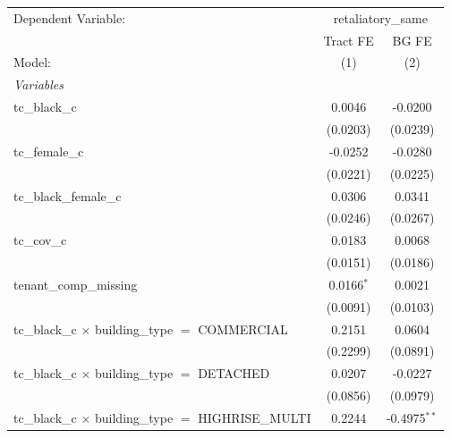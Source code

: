 \begin{tabular}{lcc}
   \tabularnewline \midrule \midrule
   Dependent Variable: & \multicolumn{2}{c}{retaliatory\_same}\\
                                                                       & Tract FE       & BG FE \\   
   Model:                                                              & (1)            & (2)\\  
   \midrule
   \emph{Variables}\\
   tc\_black\_c                                                        & 0.0046         & -0.0200\\   
                                                                       & (0.0203)       & (0.0239)\\   
   tc\_female\_c                                                       & -0.0252        & -0.0280\\   
                                                                       & (0.0221)       & (0.0225)\\   
   tc\_black\_female\_c                                                & 0.0306         & 0.0341\\   
                                                                       & (0.0246)       & (0.0267)\\   
   tc\_cov\_c                                                          & 0.0183         & 0.0068\\   
                                                                       & (0.0151)       & (0.0186)\\   
   tenant\_comp\_missing                                               & 0.0166$^{*}$   & 0.0021\\   
                                                                       & (0.0091)       & (0.0103)\\   
   tc\_black\_c $\times$ building\_type $=$ COMMERCIAL                 & 0.2151         & 0.0604\\   
                                                                       & (0.2299)       & (0.0891)\\   
   tc\_black\_c $\times$ building\_type $=$ DETACHED                   & 0.0207         & -0.0227\\   
                                                                       & (0.0856)       & (0.0979)\\   
   tc\_black\_c $\times$ building\_type $=$ HIGHRISE\_MULTI            & 0.2244         & -0.4975$^{**}$\\   

\end{tabular}

